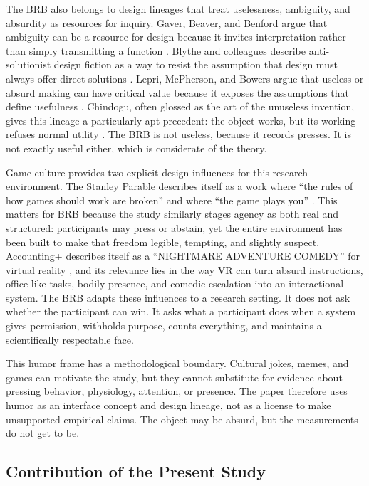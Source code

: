 The BRB also belongs to design lineages that treat uselessness, ambiguity, and absurdity as resources for inquiry. Gaver, Beaver, and Benford argue that ambiguity can be a resource for design because it invites interpretation rather than simply transmitting a function \citep{GaverEtAl2003Ambiguity}. Blythe and colleagues describe anti-solutionist design fiction as a way to resist the assumption that design must always offer direct solutions \citep{BlytheEtAl2016AntiSolutionist}. Lepri, McPherson, and Bowers argue that useless or absurd making can have critical value because it exposes the assumptions that define usefulness \citep{LepriEtAl2020UselessWorthless}. Chindogu, often glossed as the art of the unuseless invention, gives this lineage a particularly apt precedent: the object works, but its working refuses normal utility \citep{PattonBannerot2002Chindogu,Rosenbak2015UselessDesign}. The BRB is not useless, because it records presses. It is not exactly useful either, which is considerate of the theory.

Game culture provides two explicit design influences for this research environment. The Stanley Parable describes itself as a work where ``the rules of how games should work are broken'' and where ``the game plays you'' \citep{StanleyParableOfficial2026}. This matters for BRB because the study similarly stages agency as both real and structured: participants may press or abstain, yet the entire environment has been built to make that freedom legible, tempting, and slightly suspect. Accounting+ describes itself as a ``NIGHTMARE ADVENTURE COMEDY'' for virtual reality \citep{AccountingPlusOfficial2017}, and its relevance lies in the way VR can turn absurd instructions, office-like tasks, bodily presence, and comedic escalation into an interactional system. The BRB adapts these influences to a research setting. It does not ask whether the participant can win. It asks what a participant does when a system gives permission, withholds purpose, counts everything, and maintains a scientifically respectable face.

This humor frame has a methodological boundary. Cultural jokes, memes, and games can motivate the study, but they cannot substitute for evidence about pressing behavior, physiology, attention, or presence. The paper therefore uses humor as an interface concept and design lineage, not as a license to make unsupported empirical claims. The object may be absurd, but the measurements do not get to be.

\subsection{Contribution of the Present Study}

